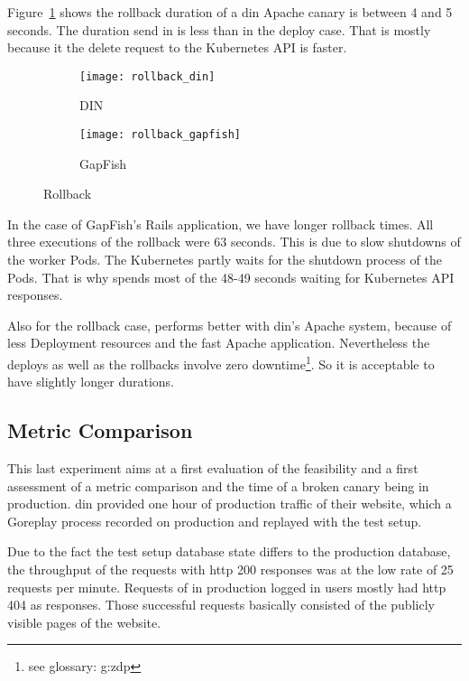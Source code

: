 Figure~\ref{fig:rollback_din} shows the rollback duration of a \gls{din} Apache canary
is between 4 and 5 seconds. The duration send in \deployer is less than in the deploy case.
That is mostly because it the delete request to the Kubernetes API is faster.

\begin{figure}[htbp]
  \centering
  \begin{subfigure}{.5\textwidth}
    \texttt{[image: rollback\_din]}
    \caption{DIN}
    \label{fig:rollback_din}
  \end{subfigure}%
  \begin{subfigure}{.5\textwidth}
    \texttt{[image: rollback\_gapfish]}
    \caption{GapFish}
    \label{fig:rollback_gapfish}
  \end{subfigure}
  \caption{Rollback}
\end{figure}

In the case of GapFish's Rails application, we have longer rollback times. All three
executions of the rollback were 63 seconds. This is due to slow shutdowns of the worker
Pods. The Kubernetes partly waits for the shutdown process of the Pods. That is why
\deployer spends most of the 48-49 seconds waiting for Kubernetes API responses.

Also for the rollback case, \deployer performs better with \gls{din}'s Apache system,
because of less Deployment resources and the fast Apache application. Nevertheless the
deploys as well as the rollbacks involve zero downtime\footnote{see glossary:
  \gls{g:zdp}}. So it is acceptable to have slightly longer durations.

\subsection{Metric Comparison}
\label{sec:eval_metrics}

This last experiment aims at a first evaluation of the feasibility and a first assessment
of a metric comparison and the time of a broken canary being in production. \gls{din}
provided one hour of production traffic of their website, which a Goreplay process
recorded on production and replayed with the test setup.

Due to the fact the test setup database state differs to the production database, the
throughput of the requests with http 200 responses was at the low rate of 25 requests per
minute. Requests of in production logged in users mostly had http 404 as responses. Those
successful requests basically consisted of the publicly visible pages of the website.

